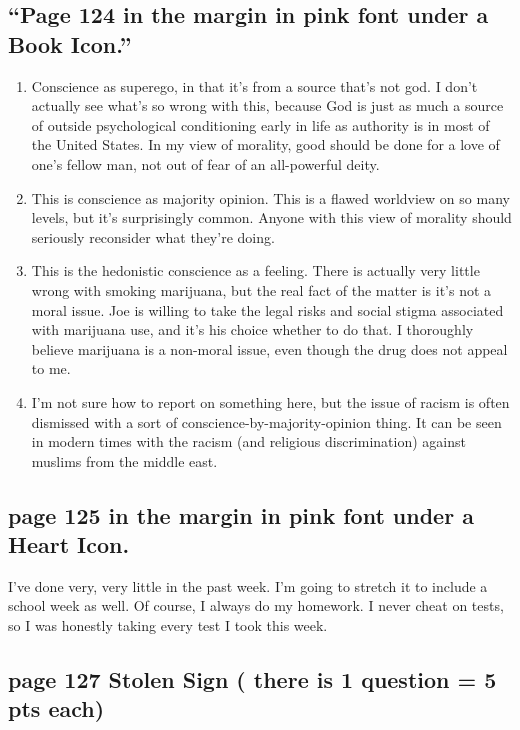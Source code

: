 \documentclass[12pt]{article}
\begin{document}
\subsection{``Page 124 in the margin in pink font under a Book Icon.''}
\begin{enumerate}
	\item Conscience as superego, in that it's from a source that's not god.  I 
		don't actually see what's so wrong with this, because God is just as much a
		source of outside psychological conditioning early in life as authority is in
		most of the United States.  In my view of morality, good should be done for
		a love of one's fellow man, not out of fear of an all-powerful deity.
	\item This is conscience as majority opinion.  This is a flawed worldview on
		so many levels, but it's surprisingly common.  Anyone with this view of
		morality should seriously reconsider what they're doing.
	\item This is the hedonistic conscience as a feeling.  There is actually
		very little wrong with smoking marijuana, but the real fact of the matter
		is it's not a moral issue.  Joe is willing to take the legal risks and 
		social stigma associated with marijuana use, and it's his choice whether
		to do that.  I thoroughly believe marijuana is a non-moral issue, even though
		the drug does not appeal to me.
	\item I'm not sure how to report on something here, but the issue of racism is
		often dismissed with a sort of conscience-by-majority-opinion thing.  It
		can be seen in modern times with the racism (and religious discrimination)
		against muslims from the middle east.  
\end{enumerate}

\subsection{page 125 in the margin in pink font under a Heart Icon.}
	I've done very, very little in the past week.  I'm going to stretch it
	to include a school week as well.  Of course, I always do my homework.  I 
	never cheat on tests, so I was honestly taking every test I took this week.  

\subsection{page 127 Stolen Sign ( there is 1 question = 5 pts each)}
\end{document}
